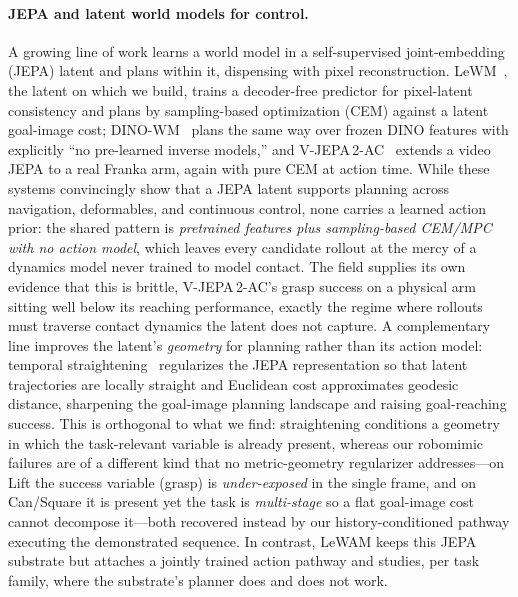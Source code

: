 \paragraph{JEPA and latent world models for control.}
A growing line of work learns a world model in a self-supervised joint-embedding (JEPA) latent and plans within it, dispensing with pixel reconstruction. LeWM~\cite{lewm}, the latent on which we build, trains a decoder-free predictor for pixel-latent consistency and plans by sampling-based optimization (CEM) against a latent goal-image cost; DINO-WM~\cite{dinowm} plans the same way over frozen DINO features with explicitly ``no pre-learned inverse models,'' and V-JEPA\,2-AC~\cite{vjepa2} extends a video JEPA to a real Franka arm, again with pure CEM at action time. While these systems convincingly show that a JEPA latent supports planning across navigation, deformables, and continuous control, none carries a learned action prior: the shared pattern is \emph{pretrained features plus sampling-based CEM/MPC with no action model}, which leaves every candidate rollout at the mercy of a dynamics model never trained to model contact. The field supplies its own evidence that this is brittle, V-JEPA\,2-AC's grasp success on a physical arm sitting well below its reaching performance, exactly the regime where rollouts must traverse contact dynamics the latent does not capture. A complementary line improves the latent's \emph{geometry} for planning rather than its action model: temporal straightening~\cite{tempstraight} regularizes the JEPA representation so that latent trajectories are locally straight and Euclidean cost approximates geodesic distance, sharpening the goal-image planning landscape and raising goal-reaching success. This is orthogonal to what we find: straightening conditions a geometry in which the task-relevant variable is already present, whereas our robomimic failures are of a different kind that no metric-geometry regularizer addresses---on Lift the success variable (grasp) is \emph{under-exposed} in the single frame, and on Can/Square it is present yet the task is \emph{multi-stage} so a flat goal-image cost cannot decompose it---both recovered instead by our history-conditioned pathway executing the demonstrated sequence. In contrast, LeWAM keeps this JEPA substrate but attaches a jointly trained action pathway and studies, per task family, where the substrate's planner does and does not work.

